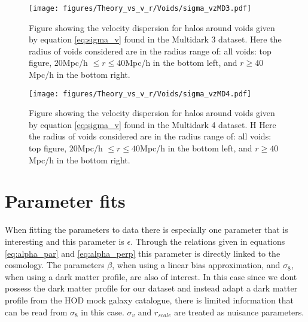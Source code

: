 \begin{figure}[H]
    \texttt{[image: figures/Theory\_vs\_v\_r/Voids/sigma\_vzMD3.pdf]}
    \caption{Figure showing the velocity dispersion for halos around voids given by equation \ref{eq:sigma_v} found in the Multidark 3 dataset. Here the radius of voids considered are in the radius range of: all voids: top figure, $20$Mpc/h $\leq r\leq 40$Mpc/h in the bottom left, and $r\geq 40$Mpc/h in the bottom right.}
    \label{fig:sigmavMD3}
\end{figure}

\begin{figure}[H]
    \texttt{[image: figures/Theory\_vs\_v\_r/Voids/sigma\_vzMD4.pdf]}
    \caption{Figure showing the velocity dispersion for halos around voids given by equation \ref{eq:sigma_v} found in the Multidark 4 dataset. H Here the radius of voids considered are in the radius range of: all voids: top figure, $20$Mpc/h $\leq r\leq 40$Mpc/h in the bottom left, and $r\geq 40$Mpc/h in the bottom right.}
    \label{fig:sigmavMD4}
\end{figure}
\section{Parameter fits}
When fitting the parameters to data there is especially one parameter that is interesting and this parameter is $\epsilon$. Through the relations given in 
equations \ref{eq:alpha_par} and \ref{eq:alpha_perp} this parameter is directly linked to the cosmology. The parameters $\beta$, when using a linear bias approximation, and $\sigma_8$,
when using a dark matter profile, are also of interest. In this case since we dont possess the dark matter profile for our dataset and instead adapt a dark matter profile from the HOD mock galaxy catalogue, there is limited information that can be read from $\sigma_8$ in this case. $\sigma_v$ and $r_{scale}$ are treated as nuisance parameters.

